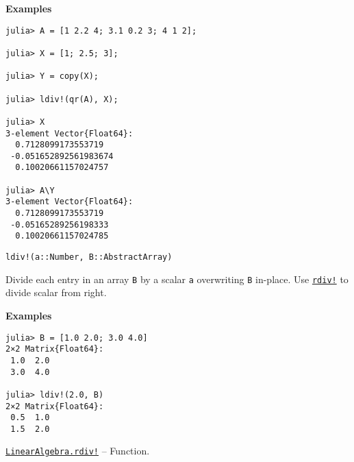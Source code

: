 \begin{adjustwidth}{2em}{0pt}
\textbf{Examples}


\begin{verbatim}
julia> A = [1 2.2 4; 3.1 0.2 3; 4 1 2];

julia> X = [1; 2.5; 3];

julia> Y = copy(X);

julia> ldiv!(qr(A), X);

julia> X
3-element Vector{Float64}:
  0.7128099173553719
 -0.051652892561983674
  0.10020661157024757

julia> A\Y
3-element Vector{Float64}:
  0.7128099173553719
 -0.05165289256198333
  0.10020661157024785
\end{verbatim}




\begin{lstlisting}
ldiv!(a::Number, B::AbstractArray)
\end{lstlisting}

Divide each entry in an array \texttt{B} by a scalar \texttt{a} overwriting \texttt{B} in-place.  Use \hyperlink{14949618513077509248}{\texttt{rdiv!}} to divide scalar from right.

\textbf{Examples}


\begin{verbatim}
julia> B = [1.0 2.0; 3.0 4.0]
2×2 Matrix{Float64}:
 1.0  2.0
 3.0  4.0

julia> ldiv!(2.0, B)
2×2 Matrix{Float64}:
 0.5  1.0
 1.5  2.0
\end{verbatim}



\end{adjustwidth}
\hypertarget{14949618513077509248}{}
\hyperlink{14949618513077509248}{\texttt{LinearAlgebra.rdiv!}}  -- {Function.}

